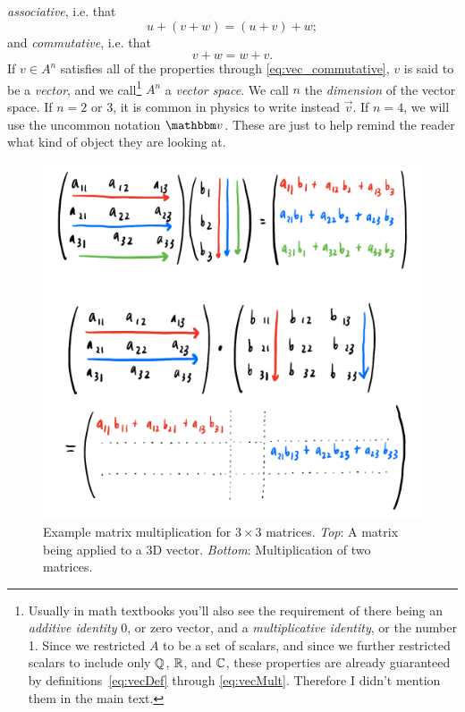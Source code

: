{\it associative}, i.e. that
\begin{equation}
u+(v+w)=(u+v)+w;
\end{equation}
and {\it commutative}, i.e. that
\begin{equation}\label{eq:vec_commutative}
v+w=w+v.
\end{equation}
If $v\in A^n$ satisfies all of the properties  through 
\eqref{eq:vec_commutative}, $v$ is said to be a {\it vector},
and we call\footnote{Usually in math textbooks you'll also see the requirement
of there being an {\it additive identity} 0, or zero
vector, and a {\it multiplicative identity},
or the number 1. Since we restricted $A$ to be a set of scalars, and since we
further restricted scalars to include only $\mathbb{Q}$, $\mathbb{R}$, and $\mathbb{C}$, these
properties are already guaranteed by definitions~\eqref{eq:vecDef} through
\eqref{eq:vecMult}. Therefore I didn't mention them in the main text.}  
$A^n$ a {\it vector space}. We call $n$
the {\it dimension} of the vector space.
If $n=2$ or 3, it is common in physics to write instead $\vec{v}$.
If $n=4$, we will use the uncommon notation $\fvec{v}$. 
These are just to help remind the reader what kind of object they are looking
at.

\begin{figure}
  \centering
  \includegraphics[width=\linewidth]{figs/matrixMult.pdf}
  \caption{Example matrix multiplication for $3\times 3$ matrices. {\it Top}: A
           matrix being applied to a 3D vector. {\it Bottom}: Multiplication of two
           matrices.}
  \label{fig:matrix}
\end{figure}

